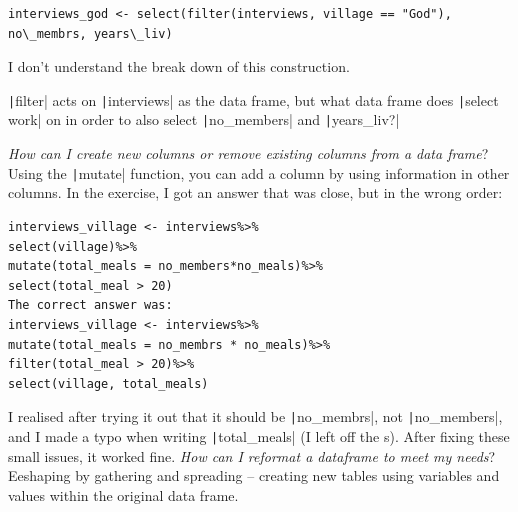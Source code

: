 \documentclass{article}
\begin{document}
{\item
\begin{verbatim}interviews_god <- select(filter(interviews, village == "God"), no\_membrs, years\_liv)\end{verbatim}
\item I don’t understand the break down of this construction.
\item \texttt|filter| acts on \texttt|interviews| as the data frame, but what data frame does \texttt|select work| on in order to also select \texttt|no_members| and \texttt|years_liv?|}
\textit{How can I create new columns or remove existing columns from a data frame}?
Using the \texttt|mutate| function, you can add a column by using information in other columns.
In the exercise, I got an answer that was close, but in the wrong order:
\begin{verbatim}
interviews_village <- interviews%>%
select(village)%>%
mutate(total_meals = no_members*no_meals)%>%
select(total_meal > 20)
The correct answer was:
interviews_village <- interviews%>%
mutate(total_meals = no_membrs * no_meals)%>%
filter(total_meal > 20)%>%
select(village, total_meals)
\end{verbatim}
I realised after trying it out that it should be \texttt|no_membrs|, not \texttt|no_members|, and I made a typo when writing \texttt|total_meals| (I left off the s).
After fixing these small issues, it worked fine.
\textit{How can I reformat a dataframe to meet my needs}?
Eeshaping by gathering and spreading – creating new tables using variables and values within the original data frame.
\end{document}
